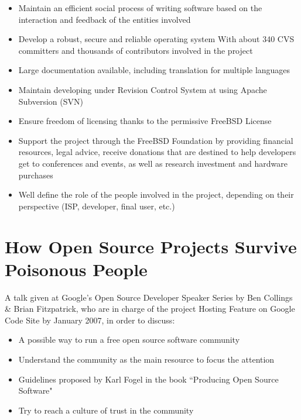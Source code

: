 \documentclass[11pt]{article} %
\begin{document}
\begin{itemize}
  \item Maintain an efficient social process of writing software based on the interaction and feedback of the entities involved
  
  \item Develop a robust, secure and reliable operating system
    With about 340 CVS committers and thousands of contributors involved in the project
  
  \item Large documentation available, including translation for multiple languages
  
  \item Maintain developing under Revision Control System at using Apache Subversion (SVN)   
  
  \item Ensure freedom of licensing thanks to the permissive FreeBSD License  

  \item Support the project through the FreeBSD Foundation by providing financial resources, legal advice, receive donations that are destined to help developers get to conferences and events, as well as research investment and hardware purchases
	
  \item Well define the role of the people involved in the project, depending on their perspective (ISP, developer, final user, etc.)
  
\end{itemize}


\section{How Open Source Projects Survive Poisonous People}


A talk given at Google's Open Source Developer Speaker Series by Ben Collings \& Brian Fitzpatrick, who are in charge of the project Hosting Feature on Google Code Site by January 2007, in order to discuss:

\begin{itemize}
  \item A possible way to run a free open source software community
  \item Understand the community as the main resource to focus the attention
  \item Guidelines proposed by Karl Fogel in the book ``Producing Open Source Software" \cite{Fogel:2005kf}
  \item Try to reach a culture of trust in the community
\end{itemize}
\end{document}
